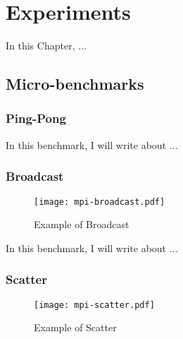 \chapter{Experiments}
\label{ch.experiments}

    In this Chapter, ...

    \section{Micro-benchmarks}

        \subsection{Ping-Pong}


            In this benchmark, I will write about ...

        \subsection{Broadcast}

            \begin{figure}[!tb]
                \centering%
                \caption{Example of \mpi Broadcast}%
                \label{fig:software-stack}%
                \texttt{[image: mpi-broadcast.pdf]}%
            \end{figure}

            In this benchmark, I will write about ...

        \subsection{Scatter}

            \begin{figure}[!tb]
                \centering%
                \caption{Example of \mpi Scatter}%
                \label{fig:software-stack}%
                \texttt{[image: mpi-scatter.pdf]}%
            \end{figure}

